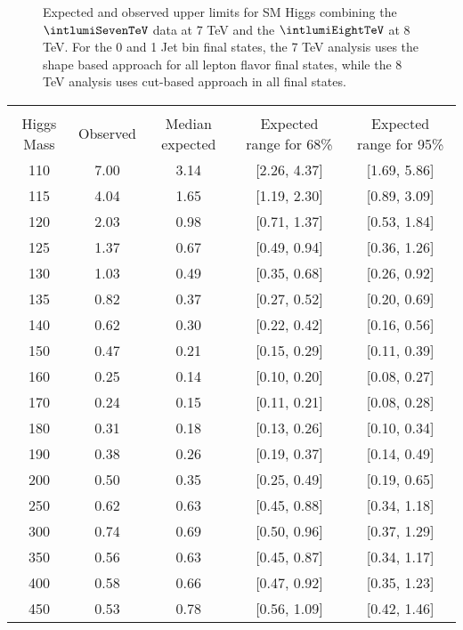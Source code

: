 \begin{figure}[!hbtp]
\centering
\caption{Expected and observed upper limits for SM Higgs combining the $\intlumiSevenTeV$ data
at 7 TeV and the $\intlumiEightTeV$ at 8 TeV.
For the 0 and 1 Jet bin final states, the 7 TeV analysis uses the shape based approach for all
lepton flavor final states, while the 8 TeV analysis uses cut-based approach in all final states.}
\label{fig:uls_cut_comb}
\end{figure}
\begin{table}[!htbp]
\begin{center}
\begin{tabular}{c c c c c}
\hline
\vspace{-3mm} && \\
Higgs Mass & Observed  & Median expected & Expected range for 68\% & Expected range for 95\%   \\
\hline
110 & 7.00 & 3.14 & [2.26, 4.37] & [1.69, 5.86] \\
115 & 4.04 & 1.65 & [1.19, 2.30] & [0.89, 3.09] \\
120 & 2.03 & 0.98 & [0.71, 1.37] & [0.53, 1.84] \\
125 & 1.37 & 0.67 & [0.49, 0.94] & [0.36, 1.26] \\
130 & 1.03 & 0.49 & [0.35, 0.68] & [0.26, 0.92] \\
135 & 0.82 & 0.37 & [0.27, 0.52] & [0.20, 0.69] \\
140 & 0.62 & 0.30 & [0.22, 0.42] & [0.16, 0.56] \\
150 & 0.47 & 0.21 & [0.15, 0.29] & [0.11, 0.39] \\
160 & 0.25 & 0.14 & [0.10, 0.20] & [0.08, 0.27] \\
170 & 0.24 & 0.15 & [0.11, 0.21] & [0.08, 0.28] \\
180 & 0.31 & 0.18 & [0.13, 0.26] & [0.10, 0.34] \\
190 & 0.38 & 0.26 & [0.19, 0.37] & [0.14, 0.49] \\
200 & 0.50 & 0.35 & [0.25, 0.49] & [0.19, 0.65] \\
250 & 0.62 & 0.63 & [0.45, 0.88] & [0.34, 1.18] \\
300 & 0.74 & 0.69 & [0.50, 0.96] & [0.37, 1.29] \\
350 & 0.56 & 0.63 & [0.45, 0.87] & [0.34, 1.17] \\
400 & 0.58 & 0.66 & [0.47, 0.92] & [0.35, 1.23] \\
450 & 0.53 & 0.78 & [0.56, 1.09] & [0.42, 1.46] \\

\end{tabular}
\end{center}
\end{table}
